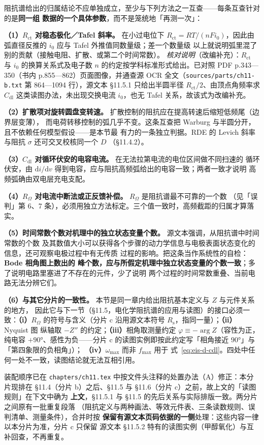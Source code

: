 \begin{crosscheck}
阻抗谱给出的归属结论不应单独成立，至少与下列方法之一互查——每条互查针对的是\textbf{同一组
数据的一个具体参数}，而不是笼统地「再测一次」：

\textbf{（1）$R_{\mathrm{ct}}$ 对稳态极化／Tafel 斜率。} 在小过电位下
$R_{\mathrm{ct}}=RT/(nFi_0)$，因此由弧直径反推的 $i_0$ 应与 Tafel 外推值同数量级；差一个数量级
以上就说明弧里混了别的贡献（接触电阻、扩散、或第二个时间常数）。
\emph{核对说明}（改编补充）：$R_{\mathrm{ct}}$ 与 $i_0$ 的换算关系式及电子数 $n$ 的约定按学科标准形式给出。已对照 PDF p.343—350（书内 p.855—862）页面图像，并通查源 OCR 全文（\texttt{sources/parts/ch11-b.txt} 第 864—1094 行），源文本 §11.5.1 只给出半圆半径 $R_{\mathrm{ct}}/2$、由顶点角频率求 $C_{\mathrm{dl}}$ 这类读图办法，未出现交换电流 $i_0$，也无 Tafel 关系，故该式为改编补充。

\textbf{（2）扩散项对旋转圆盘变转速。} 扩散控制的阻抗应在提高转速后缩短低频尾（边界层变薄），
而电荷转移控制的弧几乎不变。这条互查把 Warburg 与半圆分开，且不依赖任何模型假设——是本节最
有力的一条独立判据。RDE 的 Levich 斜率与阻抗 $\sigma$ 还可交叉校核同一个 $D$
（\S 11.4.2）。

\textbf{（3）$C_{\mathrm{dl}}$ 对循环伏安的电容电流。} 在无法拉第电流的电位区间做不同扫速的
循环伏安，由 $\mathrm{d}i/\mathrm{d}v$ 得到电容，应与阻抗高频弧给出的电容一致；两者一致才说明
高频弧确由双电层充电支配。

\textbf{（4）$R_{\Omega}$ 对电流中断法或正反馈补偿。} $R_{\Omega}$ 是阻抗谱最不可靠的一个数
（见「误判」第 6、7 条），必须用独立方法标定。三个值一致时，高频截距的归属才算落实。

\textbf{（5）时间常数个数对机理中的独立状态变量个数。} 源文本强调，从阻抗谱中时间常数的个数
及其数值大小可以获得各个步骤的动力学信息与电极表面状态变化的信息，还可观察电极过程中有无传质
过程的影响。把这条当作系统性的自检：\textbf{Bode 相角图上数出的
峰个数，应与所假定机理中独立状态变量的个数一致}；多了说明电路里塞进了不存在的元件，少了说明
两个过程的时间常数重叠、当前电路无法分辨它们。

\textbf{（6）与其它分片的一致性。} 本节是同一章内给出阻抗基本定义与 $Z$ 与元件关系的地方，
因此它与下一节（§11.5，电化学阻抗谱的应用与读图）的接口必须一致：\textbf{（i）}$R_{\Omega}$
的符号与含义（分片 c 沿用源文本符号 $R_{\mathrm{s}}$，指同一量）；\textbf{（ii）}Nyquist 图
纵轴取 $-Z''$ 的约定；\textbf{（iii）}相角取测量约定 $\varphi\equiv-\arg Z$（容性为正，纯电容
$+90$°、感性为负——分片 c 的读图实例即按此约定写「相角接近 $90$°」与「第四象限的负相角」）；
\textbf{（iv）}$\omega_{\max}$ 而非 $f_{\max}$ 用于
式~\eqref{eq:eis-d-cdl}。四处中任何一处不一致，读图结论就无法互相引用。

装配顺序已在 \texttt{chapters/ch11.tex} 中按文件头注释的处置办法（A）修正：本分片现排在
§11.4（分片 b）之后、§11.5 与 §11.6（分片 c）之前，故上文的「读图规则」在下文中确为
\textbf{上文}，§11.5.1 与 §11.5 的先后关系与实际排版一致。两分片之间原有一批重复段落
（阻抗定义与两种画法、等效元件表、三条读数规则、误判清单、测量条件），合并时按
\textbf{保留有源文本页码依据的一侧}处理：这些内容一律以本分片为准，分片 c 只保留
源文本 §11.5.2 特有的读图实例（甲醇氧化）与互补回查，不再重复。
\end{crosscheck}
